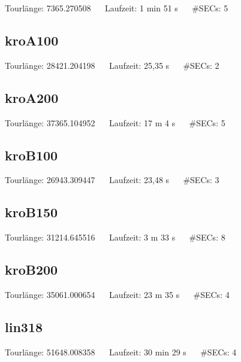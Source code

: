 \documentclass[a4paper, 10pt, ngerman]{article}
\begin{document}
\noindent Tourlänge: 7365.270508 $\quad$ Laufzeit: 1 min 51 s $\quad$ \#SECs: 5

\subsection{kroA100}



\noindent Tourlänge: 28421.204198 $\quad$ Laufzeit: 25,35 s $\quad$ \#SECs: 2 

\subsection{kroA200}



\noindent Tourlänge: 37365.104952 $\quad$ Laufzeit: 17 m 4 s $\quad$ \#SECs: 5 

\subsection{kroB100}



\noindent Tourlänge: 26943.309447 $\quad$ Laufzeit: 23,48 s $\quad$ \#SECs: 3 

\subsection{kroB150}



\noindent Tourlänge: 31214.645516 $\quad$ Laufzeit: 3 m 33 s $\quad$ \#SECs: 8

\subsection{kroB200}



\noindent Tourlänge: 35061.000654 $\quad$ Laufzeit: 23 m 35 s $\quad$ \#SECs: 4 

\subsection{lin318}



\noindent Tourlänge: 51648.008358 $\quad$ Laufzeit: 30 min 29 s $\quad$ \#SECs: 4
\end{document}

